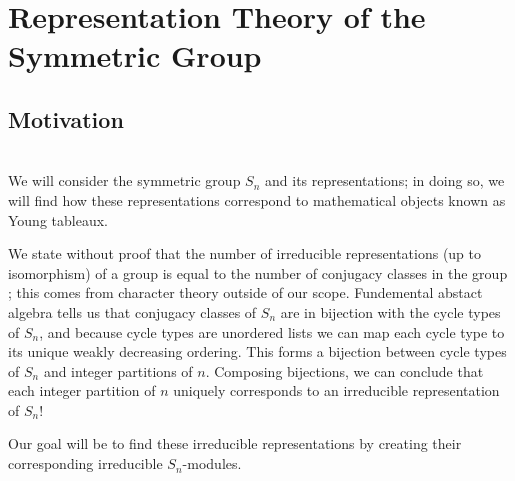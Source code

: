 \documentclass[12pt,twoside]{reedthesis}
\theoremstyle{plain}   %
\theoremstyle{definition}
\theoremstyle{remark}
\numberwithin{equation}{section}
\begin{document}
  \section{Representation Theory of the Symmetric Group}
  \subsection{Motivation}\label{motivation} \hfill\\
  We will consider the symmetric group $S_n$ and its representations; in doing so, we will find how these representations correspond to mathematical objects known as Young tableaux. \par
  We state without proof that the number of irreducible representations (up to isomorphism) of a group is equal to the number of conjugacy classes in
  the group \cite[Proposition 1.10.1]{sagan}; this comes from character theory outside of our scope. Fundemental abstact algebra tells us that 
  conjugacy classes of $S_n$ are in bijection with the cycle types of $S_n$,
  and because cycle types are unordered lists we can map each cycle type to its unique weakly decreasing ordering.
  This forms a bijection between cycle types of $S_n$ and integer partitions of $n$.
  Composing bijections, we can conclude that each integer partition of $n$ uniquely corresponds to an irreducible representation of $S_n$! \par
  Our goal will be to find these irreducible representations by creating their corresponding irreducible $S_n$-modules.
\end{document}
